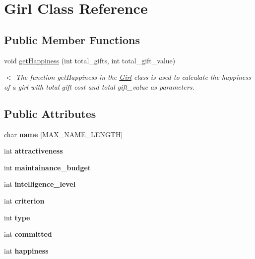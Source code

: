 \hypertarget{class_girl}{}\section{Girl Class Reference}
\label{class_girl}
\subsection*{Public Member Functions}
\begin{DoxyCompactItemize}
\item 
void \hyperlink{class_girl_a8844d2de1392d0cdcc5e201bc319a026}{get\+Happiness} (int total\+\_\+gifts, int total\+\_\+gift\+\_\+value)
\begin{DoxyCompactList}\small\item\em $<$ The function get\+Happiness in the \hyperlink{class_girl}{Girl} class is used to calculate the happiness of a girl with total gift cost and total gift\+\_\+value as parameters. \end{DoxyCompactList}\end{DoxyCompactItemize}
\subsection*{Public Attributes}
\begin{DoxyCompactItemize}
\item 
\mbox{\label{class_girl_a2004677d7018a6564637f77e943e18ed}} 
char {\bfseries name} \mbox{[}M\+A\+X\+\_\+\+N\+A\+M\+E\+\_\+\+L\+E\+N\+G\+TH\mbox{]}
\item 
\mbox{\label{class_girl_ab97bd68f8bc0ab5ee3fb9d2784ed1474}} 
int {\bfseries attractiveness}
\item 
\mbox{\label{class_girl_a26a1e9bb93af4617482020c94fa7228c}} 
int {\bfseries maintainance\+\_\+budget}
\item 
\mbox{\label{class_girl_a5c6c20728355a49c2776f291b95e8253}} 
int {\bfseries intelligence\+\_\+level}
\item 
\mbox{\label{class_girl_a1a2a395adc6fdf036a4487892ea4cebb}} 
int {\bfseries criterion}
\item 
\mbox{\label{class_girl_ac0242bb0ae7c23f69a75537437f76586}} 
int {\bfseries type}
\item 
\mbox{\label{class_girl_ac5829e7ec762f1a3fb7484acfd6c1680}} 
int {\bfseries committed}
\item 
\mbox{\label{class_girl_a50337447735a8f518fd817338d04d5b9}} 
int {\bfseries happiness}
\end{DoxyCompactItemize}



